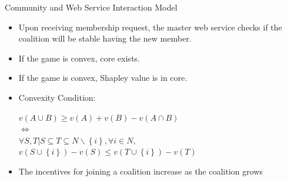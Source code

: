 \documentclass{beamer}
\begin{document}
\begin{frame}{Community and Web Service Interaction Model}
    \begin{itemize}
        \item Upon receiving membership request, the master web service checks if the coalition will be stable having the new member.
        \item If the game is convex, core exists.
        \item If the game is convex, Shapley value is in core.
        \item Convexity Condition:
        \begin{center}
          $v(A \cup B) \geq v(A) + v(B) - v(A \cap B)$ \\
          $\Leftrightarrow$  \\
          $\forall S,T | S \subseteq T \subseteq N \backslash \left\{i\right\}, \forall i \in N,$ \\
          {\color{blue} $v(S \cup \left\{i\right\}) - v(S) \leq v (T \cup \left\{i\right\}) - v(T)$ }
        \end{center}
        \item The incentives for joining a coalition increase as the coalition grows
    \end{itemize}       	
\end{frame}
\end{document}
